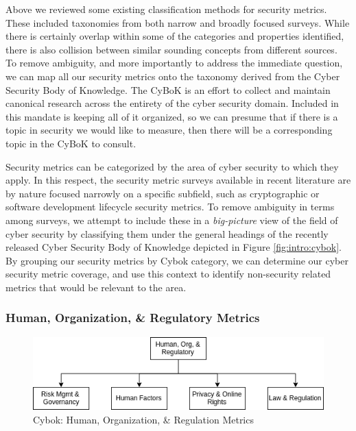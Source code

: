 
Above we reviewed some existing classification methods for security metrics. These included taxonomies from both narrow and broadly focused surveys. While there is certainly overlap within some of the categories and properties identified, there is also collision between similar sounding concepts from different sources. To remove ambiguity, and more importantly to address the immediate question, we can map all our security metrics onto the taxonomy derived from the Cyber Security Body of Knowledge. The CyBoK is an effort to collect and maintain canonical research across the entirety of the cyber security domain. Included in this mandate is keeping all of it organized, so we can presume that if there is a topic in security we would like to measure, then there will be a corresponding topic in the CyBoK to consult. 

Security metrics can be categorized by the area of cyber security to which they apply. In this respect, the security metric surveys available in recent literature are by nature focused narrowly on a specific subfield, such as cryptographic or software development lifecycle security metrics. To remove ambiguity in terms among surveys, we attempt to include these in a \textit{big-picture} view of the field of cyber security by classifying them under the general headings of the recently released Cyber Security Body of Knowledge\cite{Rashid_Chivers_Danezis_Lupu_Martin} depicted in Figure \ref{fig:intro:cybok}. By grouping our security metrics by Cybok category, we can determine our cyber security metric coverage, and use this context to identify non-security related metrics that would be relevant to the area. 

\subsubsection{Human, Organization, \& Regulatory Metrics}

\begin{figure}[ht]

\begin{mdframed}
\centering
\includegraphics[width=.8\linewidth]{resource/img/ch_background/cybok_metrics/cybok_hor.png}
\end{mdframed}
\caption{Cybok: Human, Organization, \& Regulation Metrics
\label{fig:background:cybok_hor_metrics}}
\end{figure} 

